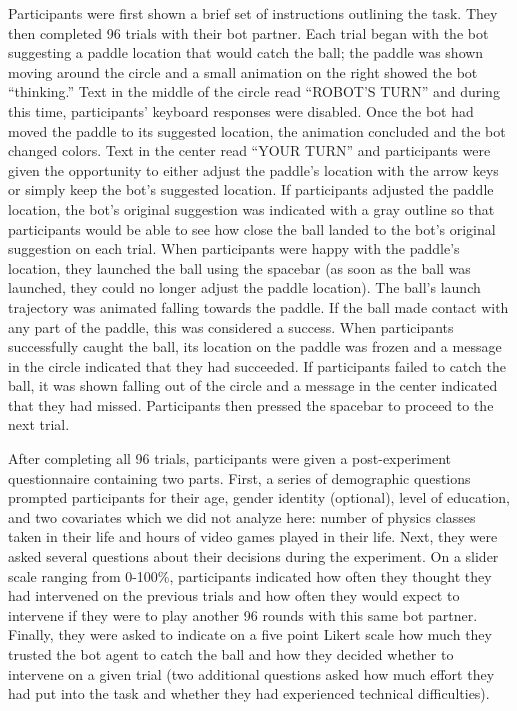 \documentclass[10pt,letterpaper]{article}
\begin{document}
Participants were first shown a brief set of instructions outlining the task. They then completed 96 trials with their bot partner. Each trial began with the bot suggesting a paddle location that would catch the ball; the paddle was shown moving around the circle and a small animation on the right showed the bot ``thinking.'' Text in the middle of the circle read ``ROBOT'S TURN'' and during this time, participants' keyboard responses were disabled. Once the bot had moved the paddle to its suggested location, the animation concluded and the bot changed colors. Text in the center read ``YOUR TURN'' and participants were given the opportunity to either adjust the paddle's location with the arrow keys or simply keep the bot's suggested location. If participants adjusted the paddle location, the bot's original suggestion was indicated with a gray outline so that participants would be able to see how close the ball landed to the bot's original suggestion on each trial. When participants were happy with the paddle's location, they launched the ball using the spacebar (as soon as the ball was launched, they could no longer adjust the paddle location). The ball's launch trajectory was animated falling towards the paddle. If the ball made contact with any part of the paddle, this was considered a success. When participants successfully caught the ball, its location on the paddle was frozen and a message in the circle indicated that they had succeeded. If participants failed to catch the ball, it was shown falling out of the circle and a message in the center indicated that they had missed. Participants then pressed the spacebar to proceed to the next trial. 

After completing all 96 trials, participants were given a post-experiment questionnaire containing two parts. First, a series of demographic questions prompted participants for their age, gender identity (optional), level of education, and two covariates which we did not analyze here: number of physics classes taken in their life and hours of video games played in their life. Next, they were asked several questions about their decisions during the experiment. On a slider scale ranging from 0-100\%, participants indicated how often they thought they had intervened on the previous trials and how often they would expect to intervene if they were to play another 96 rounds with this same bot partner. Finally, they were asked to indicate on a five point Likert scale how much they trusted the bot agent to catch the ball and how they decided whether to intervene on a given trial (two additional questions asked how much effort they had put into the task and whether they had experienced technical difficulties). 
\end{document}
